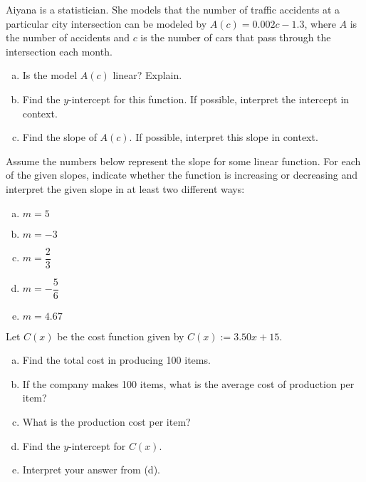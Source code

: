 \documentclass[11pt,letterpaper]{article}
\begin{document}
\prob Aiyana is a statistician. She models that the number of traffic accidents at a particular city intersection can be modeled by $A(c)= 0.002c - 1.3$, where $A$ is the number of accidents and $c$ is the number of cars that pass through the intersection each month. 
	\begin{enumerate}[(a)]
	\item Is the model $A(c)$ linear? Explain.
	\item Find the $y$-intercept for this function. If possible, interpret the intercept in context. 
	\item Find the slope of $A(c)$. If possible, interpret this slope in context. 
	\end{enumerate} \pspace


\prob Assume the numbers below represent the slope for some linear function. For each of the given slopes, indicate whether the function is increasing or decreasing and interpret the given slope in at least two different ways:
	\begin{enumerate}[(a)]
	\item $m= 5$
	\item $m= -3$
	\item $m= \dfrac{2}{3}$
	\item $m= -\dfrac{5}{6}$
	\item $m= 4.67$
	\end{enumerate} \pspace


\prob Let $C(x)$ be the cost function given by $C(x):= 3.50x + 15$.
        \begin{enumerate}[(a)]
        \item Find the total cost in producing 100 items. 
        \item If the company makes 100 items, what is the average cost of production per item? 
        \item What is the production cost per item? 
        \item Find the $y$-intercept for $C(x)$. 
        \item Interpret your answer from (d). 
        \end{enumerate} \pspace
\end{document}
